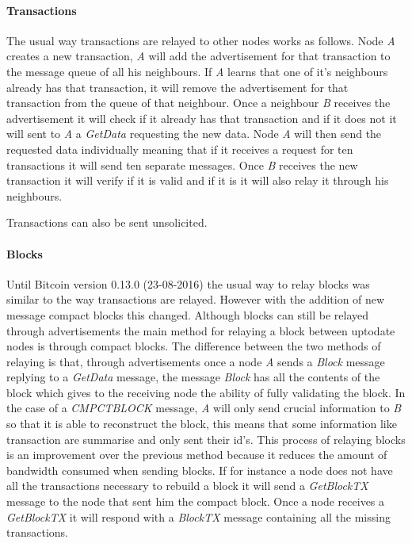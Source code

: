 \paragraph*{Transactions}
The usual way transactions are relayed to other nodes works as follows. Node \textit{A} creates a new transaction, \textit{A} will add the advertisement for that transaction to the message queue of all his neighbours. If \textit{A} learns that one of it's neighbours already has that transaction, it will remove the advertisement for that transaction from the queue of that neighbour. Once a neighbour \textit{B} receives the advertisement it will check if it already has that transaction and if it does not it will sent to \textit{A} a \textit{GetData} requesting the new data. Node \textit{A} will then send the requested data individually meaning that if it receives a request for ten transactions it will send ten separate messages. Once \textit{B} receives the new transaction it will verify if it is valid and if it is it will also relay it through his neighbours.

Transactions can also be sent unsolicited.

\paragraph*{Blocks}
Until Bitcoin version 0.13.0 (23-08-2016) the usual way to relay blocks was similar to the way transactions are relayed. However with the addition of new message compact blocks this changed. Although blocks can still be relayed through advertisements the main method for relaying a block between uptodate nodes is through compact blocks. The difference between the two methods of relaying is that, through advertisements once a node \textit{A} sends a \textit{Block} message replying to a \textit{GetData} message, the message \textit{Block} has all the contents of the block which gives to the receiving node the ability of fully validating the block. In the case of a \textit{CMPCTBLOCK} message, \textit{A} will only send crucial information to \textit{B} so that it is able to reconstruct the block, this means that some information like transaction are summarise and only sent their id's. This process of relaying blocks is an improvement over the previous method because it reduces the amount of bandwidth consumed when sending blocks. If for instance a node does not have all the transactions necessary to rebuild a block it will send a \textit{GetBlockTX} message to the node that sent him the compact block. Once a node receives a \textit{GetBlockTX} it will respond with a  \textit{BlockTX} message containing all the missing transactions.

